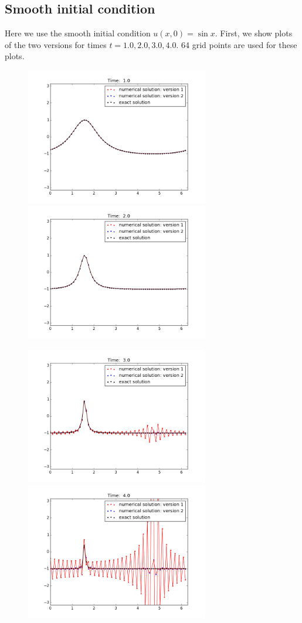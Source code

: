 \documentclass[12pt]{article}
\begin{document}
\subsection*{Smooth initial condition }
Here we use the smooth initial condition $u(x, 0) = \sin{x}$. First, we show plots of the two versions for times $t = 1.0, 2.0, 3.0, 4.0$. 64 grid points are used for these plots.
\begin{figure}[H]
\includegraphics[width=8cm]{images/1frame20.png}
\includegraphics[width=8cm]{images/1frame40.png}
\end{figure}
\begin{figure}[H]
\includegraphics[width=8cm]{images/1frame60.png}
\includegraphics[width=8cm]{images/1frame80.png}
\end{figure}
\end{document}
